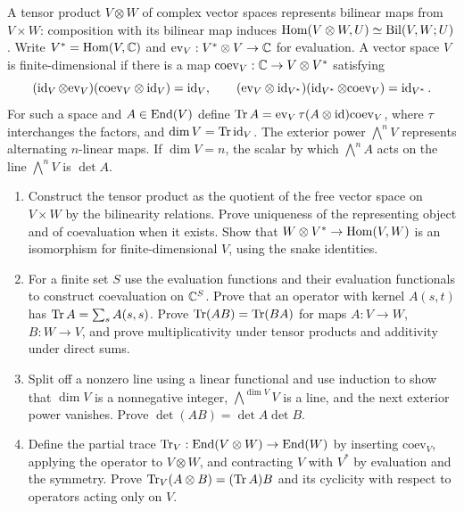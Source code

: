 \begin{exercise}
A tensor product $V\otimes W$ of complex vector spaces represents
bilinear maps from $V\times W$: composition with its bilinear map
induces $\operatorname{Hom}(V\otimes W,U)\simeq\operatorname{Bil}(V,W;U)$.
Write $V^*=\operatorname{Hom}(V,\mathbb C)$ and
$\mathrm{ev}_V:V^*\otimes V\to\mathbb C$ for evaluation.
A vector space $V$ is finite-dimensional if there is a map
$\mathrm{coev}_V:\mathbb C\to V\otimes V^*$ satisfying
\[
 (\operatorname{id}_V\otimes\mathrm{ev}_V)(\mathrm{coev}_V\otimes\operatorname{id}_V)=\operatorname{id}_V,
 \qquad
 (\mathrm{ev}_V\otimes\operatorname{id}_{V^*})(\operatorname{id}_{V^*}\otimes\mathrm{coev}_V)=\operatorname{id}_{V^*}.
\]
For such a space and $A\in\operatorname{End}(V)$ define
$\operatorname{Tr} A=\mathrm{ev}_V\,\tau(A\otimes\operatorname{id})\mathrm{coev}_V$,
where $\tau$ interchanges the factors, and $\dim V=\operatorname{Tr}\operatorname{id}_V$.
The exterior power $\bigwedge^n V$ represents alternating $n$-linear
maps. If $\dim V=n$, the scalar by which $\bigwedge^n A$ acts on
the line $\bigwedge^n V$ is $\det A$.
\begin{enumerate}[label=(\alph*)]
\item Construct the tensor product as the quotient of the free vector
space on $V\times W$ by the bilinearity relations. Prove uniqueness
of the representing object and of coevaluation when it exists.
Show that $W\otimes V^*\to\operatorname{Hom}(V,W)$ is an isomorphism for
finite-dimensional $V$, using the snake identities.
\item For a finite set $S$ use the evaluation functions and their
evaluation functionals to construct coevaluation on $\mathbb C^S$.
Prove that an operator with kernel $A(s,t)$ has
$\operatorname{Tr} A=\sum_s A(s,s)$. Prove $\operatorname{Tr}(AB)=\operatorname{Tr}(BA)$ for maps
$A:V\to W$, $B:W\to V$, and prove multiplicativity under tensor
products and additivity under direct sums.
\item Split off a nonzero line using a linear functional and use
induction to show that $\dim V$ is a nonnegative integer,
$\bigwedge^{\dim V}V$ is a line, and the next exterior power vanishes.
Prove $\det(AB)=\det A\det B$.
\item Define the partial trace $\operatorname{Tr}_V:\operatorname{End}(V\otimes W)\to\operatorname{End}(W)$
by inserting $\mathrm{coev}_V$, applying the operator to $V\otimes W$,
and contracting $V$ with $V^*$ by evaluation and the symmetry.
Prove $\operatorname{Tr}_V(A\otimes B)=(\operatorname{Tr} A)B$ and its cyclicity with respect
to operators acting only on $V$.
\end{enumerate}
\end{exercise}

